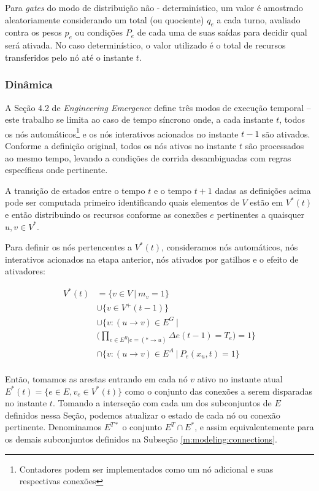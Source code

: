 \documentclass[10pt,a4paper]{article}
\begin{document}
Para \textit{gates} do modo de distribuição não - determinístico, um valor é amostrado aleatoriamente considerando um total (ou quociente) $q_e$ a cada turno, avaliado contra os pesos $p_e$ ou condições $P_e$ de cada uma de suas saídas para decidir qual será ativada. No caso determinístico, o valor utilizado é o total de recursos transferidos pelo nó até o instante $t$.

\subsubsection{Dinâmica}
\label{m:modeling:dynamics}
A Seção 4.2 de \textit{Engineering Emergence} define três modos de execução temporal -- este trabalho se limita ao caso de tempo síncrono onde, a cada instante $t$, todos os nós automáticos\footnote{Contadores podem ser implementados como um nó adicional e suas respectivas conexões} e os nós interativos acionados no instante $t-1$ são ativados. Conforme a definição original, todos os nós ativos no instante $t$ são processados ao mesmo tempo, levando a condições de corrida desambiguadas com regras específicas onde pertinente.

A transição de estados entre o tempo $t$ e o tempo $t+1$ dadas as definições acima pode ser computada primeiro identificando quais elementos de $V$ estão em $V^*(t)$ e então distribuindo os recursos conforme as conexões $e$ pertinentes a quaisquer $u,v \in V^*$.

Para definir os nós pertencentes a $V^*(t)$, consideramos nós automáticos, nós interativos acionados na etapa anterior, nós ativados por gatilhos e o efeito de ativadores:

\begin{align*}
    V^*(t) &= \{v \in V \ | \ m_v = 1\}\\& \cup \{v \in V^+(t-1)\}\\
    & \cup \{v: (u \rightarrow v) \in E^G\ | \\\
    &\Big(\prod_{e \in E^R | e = (* \rightarrow u)}{\Delta e(t-1) = T_e \Big)} = 1 \}\\
    &\cap \{v: (u \rightarrow v) \in E^A\ | \ P_e(x_u, t) = 1 \}\\
\end{align*}

Então, tomamos as arestas entrando em cada nó $v$ ativo no instante atual $E^*(t) = \{e \in E, v_e \in V^*(t)\}$ como o conjunto das conexões a serem disparadas no instante $t$. Tomando a interseção com cada um dos subconjuntos de $E$ definidos nessa Seção, podemos atualizar o estado de cada nó ou conexão pertinente. Denominamos $E^{T*}$ o conjunto $E^T \cap E^*$, e assim equivalentemente para os demais subconjuntos definidos na Subseção \ref{m:modeling:connections}.
\end{document}
